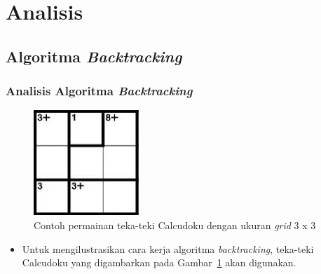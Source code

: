 \documentclass{beamer}
\begin{document}

\section{Analisis}

\subsection{Algoritma \protect\textit{Backtracking}}

\begin{frame}
\frametitle{Analisis Algoritma \textit{Backtracking}}
\begin{figure}
\centering
\captionsetup{justification=centering}
\includegraphics[scale=1]{Gambar/Backtracking4}
\caption[Contoh permainan teka-teki Calcudoku dengan ukuran \textit{grid} 3 x 3]{Contoh permainan teka-teki Calcudoku dengan ukuran \textit{grid} 3 x 3}
\label{fig:backtracking4}
\end{figure}
\begin{itemize}
\item Untuk mengilustrasikan cara kerja algoritma \textit{backtracking}, teka-teki Calcudoku yang digambarkan pada Gambar~\ref{fig:backtracking4} akan digunakan.
\end{itemize}
\end{frame}

\end{document}
